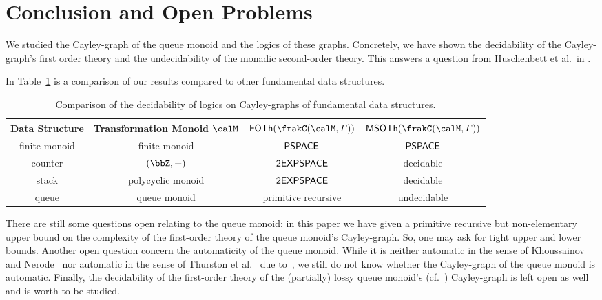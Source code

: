 \section{Conclusion and Open Problems}
We studied the Cayley-graph of the queue monoid and the logics of these graphs. Concretely, we have shown the decidability of the Cayley-graph's first order theory and the undecidability of the monadic second-order theory. This answers a question from Huschenbett et al.\ in \cite{HusKZ17}.

In Table~\ref{tab:conclusion} is a comparison of our results compared to other fundamental data structures.

\begin{table}[H]
	\begin{tabular}{cc|cc}
		Data Structure & Transformation Monoid $\calM$ & $\FOTh{\cayley{\calM}{\varGamma}}$ & $\MSOTh{\cayley{\calM}{\varGamma}}$\\
		\hline
		\hline
		finite monoid & finite monoid & $\mathsf{PSPACE}$ \cite{Graedel03} & $\mathsf{PSPACE}$ \cite{Graedel03}\\
		counter & $(\bbZ,+)$ & $\mathsf{2EXPSPACE}$ \cite{KusL11} & decidable \cite{KusL06}\\
		stack & polycyclic monoid & $\mathsf{2EXPSPACE}$ \cite{KusL11} & decidable \cite{DelKT03,KusL06}\\
		queue & queue monoid & primitive recursive & undecidable
	\end{tabular}
	\caption{Comparison of the decidability of logics on Cayley-graphs of fundamental data structures.\label{tab:conclusion}}
\end{table}%
There are still some questions open relating to the queue monoid: in this paper we have given a primitive recursive but non-elementary upper bound on the complexity of the first-order theory of the queue monoid's Cayley-graph. So, one may ask for tight upper and lower bounds.
Another open question concern the automaticity of the queue monoid. While it is neither automatic in the sense of Khoussainov and Nerode~\cite{KN95} nor automatic in the sense of Thurston et al.~\cite{CEHLPT92} due to~\cite{HusKZ17}, we still do not know whether the Cayley-graph of the queue monoid is automatic.
Finally, the decidability of the first-order theory of the (partially) lossy queue monoid's (cf.~\cite{KKP18,Koe18}) Cayley-graph is left open as well and is worth to be studied.